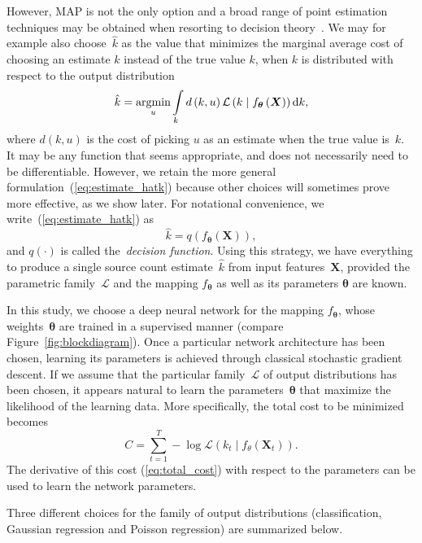 However, MAP is not the only option and a broad range of point estimation techniques may be obtained when resorting to decision theory~\cite{berger1985}.
We may for example also choose~$\hat{k}$ as the value that minimizes the marginal average cost of choosing an estimate $\hat{k}$ instead of the true value $k$, when $k$ is distributed with respect to the output distribution
\begin{equation}
\hat{k}=\underset{u}{\text{argmin}}\intop_{k}d\left(k,u\right)\mathcal{L}\left(k\mid f_{\boldsymbol{\theta}}\left(\boldsymbol{X}\right)\right) \mathrm{d} k,\label{eq:estimate_hatk}
\end{equation}
where $d\left(k,u\right)$ is the cost of picking $u$ as an estimate when the true value is~$k$.
It may be any function that seems appropriate, and does not necessarily need to be differentiable.
However, we retain the more general formulation~(\ref{eq:estimate_hatk}) because other choices will sometimes prove more effective, as we show later.
For notational convenience, we write~(\ref{eq:estimate_hatk}) as
\begin{equation}
\hat{k}=q\left(f_{\boldsymbol{\theta}}\left(\boldsymbol{X}\right)\right),
\end{equation}
and $q\left(\cdot\right)$ is called the~\textit{decision function}.
Using this strategy, we have everything to produce a single source count estimate~$\hat{k}$ from input features~$\mathbf{X}$, provided the parametric family~$\mathcal{L}$ and the mapping $f_{\boldsymbol{\theta}}$ as well as its parameters $\boldsymbol{\theta}$ are known.

In this study, we choose a deep neural network for the mapping $f_{\boldsymbol{\theta}}$, whose weights~$\boldsymbol{\theta}$ are trained in a supervised manner (compare Figure~\ref{fig:blockdiagram}).
Once a particular network architecture has been chosen, learning its parameters is achieved through classical stochastic gradient descent.
If we assume that the particular family~$\mathcal{L}$ of output distributions has been chosen, it appears natural to learn the parameters~$\boldsymbol{\theta}$ that maximize the likelihood of the learning data.
More specifically, the total cost to be minimized becomes
\begin{equation}
C=\sum_{t=1}^{T}-\log\mathcal{L}\left(k_{t}\mid f_{\theta}\left(\boldsymbol{X}_{t}\right)\right).\label{eq:total_cost}
\end{equation}
The derivative of this cost (\ref{eq:total_cost}) with respect to the parameters can be used to learn the network parameters.
\par
Three different choices for the family of output distributions (classification, Gaussian regression and Poisson regression) are summarized below.

